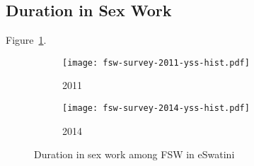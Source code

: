 \subsection{Duration in Sex Work}\label{app.model.fsw.dur}
Figure~\ref{fig:fsw.dur}.
\begin{figure}
  \begin{subfigure}{0.5\linewidth}
    \texttt{[image: fsw-survey-2011-yss-hist.pdf]}
    \caption{2011 \cite{Baral2014}}
  \end{subfigure}%
  \begin{subfigure}{0.5\linewidth}
    \texttt{[image: fsw-survey-2014-yss-hist.pdf]}
    \caption{2014 \cite{EswKP2014}}
  \end{subfigure}
  \caption{Duration in sex work among FSW in eSwatini}
  \label{fig:fsw.dur}
\end{figure}